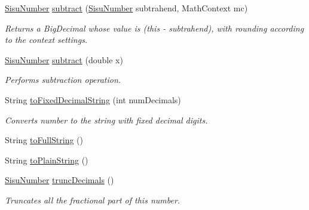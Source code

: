 \begin{DoxyCompactItemize}
\hyperlink{classcom_1_1aarrelaakso_1_1drawl_1_1_sisu_number}{Sisu\+Number} \hyperlink{classcom_1_1aarrelaakso_1_1drawl_1_1_sisu_number_a4d5626352a147191233da4da474c34f3}{subtract} (\hyperlink{classcom_1_1aarrelaakso_1_1drawl_1_1_sisu_number}{Sisu\+Number} subtrahend, Math\+Context mc)
\begin{DoxyCompactList}\small\item\em Returns a Big\+Decimal whose value is (this -\/ subtrahend), with rounding according to the context settings. \end{DoxyCompactList}\item 
\hyperlink{classcom_1_1aarrelaakso_1_1drawl_1_1_sisu_number}{Sisu\+Number} \hyperlink{classcom_1_1aarrelaakso_1_1drawl_1_1_sisu_number_a16d6415b9c006f6d27a8ad5c60e77d03}{subtract} (double x)
\begin{DoxyCompactList}\small\item\em Performs subtraction operation. \end{DoxyCompactList}\item 
String \hyperlink{classcom_1_1aarrelaakso_1_1drawl_1_1_sisu_number_a3d8585ae00c288b063998e0c65950333}{to\+Fixed\+Decimal\+String} (int num\+Decimals)
\begin{DoxyCompactList}\small\item\em Converts number to the string with fixed decimal digits. \end{DoxyCompactList}\item 
String \hyperlink{classcom_1_1aarrelaakso_1_1drawl_1_1_sisu_number_af92a070f5f79dbd684b2c1b8cf423c6f}{to\+Full\+String} ()
\item 
String \hyperlink{classcom_1_1aarrelaakso_1_1drawl_1_1_sisu_number_af5251e6a7d1f5ed6762394384f2ec604}{to\+Plain\+String} ()
\item 
\hyperlink{classcom_1_1aarrelaakso_1_1drawl_1_1_sisu_number}{Sisu\+Number} \hyperlink{classcom_1_1aarrelaakso_1_1drawl_1_1_sisu_number_ad237bd3a51bc78b3e8cf78d53c1d09c9}{trunc\+Decimals} ()
\begin{DoxyCompactList}\small\item\em Truncates all the fractional part of this number. \end{DoxyCompactList}\end{DoxyCompactItemize}
